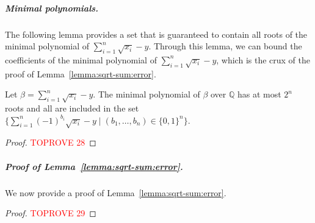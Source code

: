 \documentclass[a4paper,UKenglish,cleveref,autoref,thm-restate,colorlinks]{lipics-v2021}
\newcommand{\sqsx}{x} \newcommand{\sqsxVect}{\bar{x}} \newcommand{\sqsm}{m} \newcommand{\sqsy}{y} \newcommand{\sqsi}{i} \newcommand{\sqsn}{n} \newcommand{\sqsSize}{E}
\newcommand{\IQ}{\mathbb{Q}}
\begin{document}
\subparagraph*{Minimal polynomials.}
The following lemma provides a set that is guaranteed to contain all roots of the minimal polynomial of $\sum_{\sqsi=1}^\sqsn\sqrt{\sqsx_\sqsi}-\sqsy$.
Through this lemma, we can bound the coefficients of the minimal polynomial of $\sum_{\sqsi=1}^\sqsn\sqrt{\sqsx_\sqsi}-\sqsy$, which is the crux of the proof of Lemma~\ref{lemma:sqrt-sum:error}.

\begin{lemma}\label{lemma:sqrt-sum:roots}
  Let $\beta = \sum_{\sqsi=1}^\sqsn\sqrt{\sqsx_\sqsi} - \sqsy$.
  The minimal polynomial of $\beta$ over $\IQ$ has at most $2^\sqsn$ roots and all are included in the set $\{\sum_{\sqsi=1}^{\sqsn}(-1)^{b_\sqsi}\sqrt{\sqsx_\sqsi} - \sqsy\mid(b_1, \ldots, b_\sqsn)\in\{0, 1\}^\sqsn\}$.
\end{lemma}
\begin{proof}\textcolor{red}{TOPROVE 28}\end{proof}

\subparagraph*{Proof of Lemma~\ref{lemma:sqrt-sum:error}.}
We now provide a proof of Lemma~\ref{lemma:sqrt-sum:error}.

\lemmaSqrtSumError*
\begin{proof}\textcolor{red}{TOPROVE 29}\end{proof}

 
\end{document}
